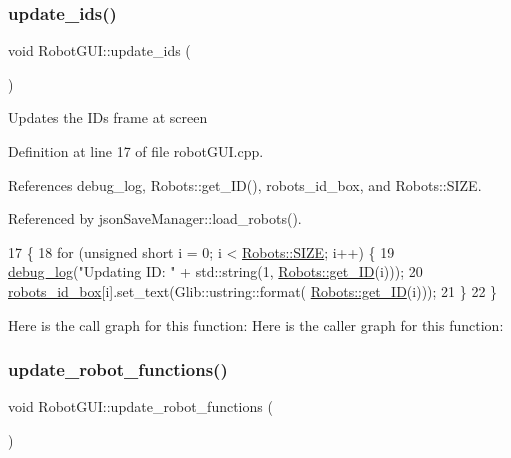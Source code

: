 \subsubsection{\texorpdfstring{update\+\_\+ids()}{update\_ids()}}
{\footnotesize\ttfamily void Robot\+G\+U\+I\+::update\+\_\+ids (\begin{DoxyParamCaption}{ }\end{DoxyParamCaption})}

Updates the I\+Ds frame at screen 

Definition at line 17 of file robot\+G\+U\+I.\+cpp.



References debug\+\_\+log, Robots\+::get\+\_\+\+I\+D(), robots\+\_\+id\+\_\+box, and Robots\+::\+S\+I\+ZE.



Referenced by json\+Save\+Manager\+::load\+\_\+robots().


\begin{DoxyCode}
17                           \{
18     \textcolor{keywordflow}{for} (\textcolor{keywordtype}{unsigned} \textcolor{keywordtype}{short} i = 0; i < \hyperlink{class_robots_ae9df2f1d345ad6740f0459956cdd4712}{Robots::SIZE}; i++) \{
19         \hyperlink{debug_8hpp_afde3f42696113719c9ae35507125ee6e}{debug\_log}(\textcolor{stringliteral}{"Updating ID: "} + std::string(1, \hyperlink{class_robots_a306bb88b37b41cff35018d51d8228d65}{Robots::get\_ID}(i)));
20         \hyperlink{class_robot_g_u_i_a1e475a8f99d5f0b3b29286731ddf0550}{robots\_id\_box}[i].set\_text(Glib::ustring::format(
      \hyperlink{class_robots_a306bb88b37b41cff35018d51d8228d65}{Robots::get\_ID}(i)));
21     \}
22 \}
\end{DoxyCode}
Here is the call graph for this function\+:
Here is the caller graph for this function\+:
\mbox{\label{class_robot_g_u_i_a88e9422aa99db2dd70403650ab1551a4}} 
\subsubsection{\texorpdfstring{update\+\_\+robot\+\_\+functions()}{update\_robot\_functions()}}
{\footnotesize\ttfamily void Robot\+G\+U\+I\+::update\+\_\+robot\+\_\+functions (\begin{DoxyParamCaption}{ }\end{DoxyParamCaption})}

